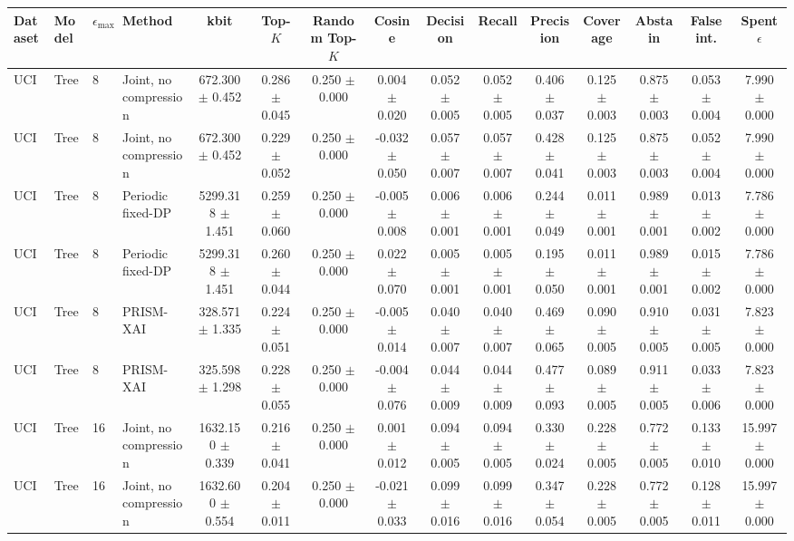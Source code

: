 \begin{tabular}{llllccccccccccc}
\toprule
Dataset & Model & $\epsilon_{\max}$ & Method & kbit & Top-$K$ & Random Top-$K$ & Cosine & Decision & Recall & Precision & Coverage & Abstain & False int. & Spent $\epsilon$ \\
\midrule
UCI & Tree & 8 & Joint, no compression & 672.300 $\pm$ 0.452 & 0.286 $\pm$ 0.045 & 0.250 $\pm$ 0.000 & 0.004 $\pm$ 0.020 & 0.052 $\pm$ 0.005 & 0.052 $\pm$ 0.005 & 0.406 $\pm$ 0.037 & 0.125 $\pm$ 0.003 & 0.875 $\pm$ 0.003 & 0.053 $\pm$ 0.004 & 7.990 $\pm$ 0.000 \\
UCI & Tree & 8 & Joint, no compression & 672.300 $\pm$ 0.452 & 0.229 $\pm$ 0.052 & 0.250 $\pm$ 0.000 & -0.032 $\pm$ 0.050 & 0.057 $\pm$ 0.007 & 0.057 $\pm$ 0.007 & 0.428 $\pm$ 0.041 & 0.125 $\pm$ 0.003 & 0.875 $\pm$ 0.003 & 0.052 $\pm$ 0.004 & 7.990 $\pm$ 0.000 \\
UCI & Tree & 8 & Periodic fixed-DP & 5299.318 $\pm$ 1.451 & 0.259 $\pm$ 0.060 & 0.250 $\pm$ 0.000 & -0.005 $\pm$ 0.008 & 0.006 $\pm$ 0.001 & 0.006 $\pm$ 0.001 & 0.244 $\pm$ 0.049 & 0.011 $\pm$ 0.001 & 0.989 $\pm$ 0.001 & 0.013 $\pm$ 0.002 & 7.786 $\pm$ 0.000 \\
UCI & Tree & 8 & Periodic fixed-DP & 5299.318 $\pm$ 1.451 & 0.260 $\pm$ 0.044 & 0.250 $\pm$ 0.000 & 0.022 $\pm$ 0.070 & 0.005 $\pm$ 0.001 & 0.005 $\pm$ 0.001 & 0.195 $\pm$ 0.050 & 0.011 $\pm$ 0.001 & 0.989 $\pm$ 0.001 & 0.015 $\pm$ 0.002 & 7.786 $\pm$ 0.000 \\
UCI & Tree & 8 & PRISM-XAI & 328.571 $\pm$ 1.335 & 0.224 $\pm$ 0.051 & 0.250 $\pm$ 0.000 & -0.005 $\pm$ 0.014 & 0.040 $\pm$ 0.007 & 0.040 $\pm$ 0.007 & 0.469 $\pm$ 0.065 & 0.090 $\pm$ 0.005 & 0.910 $\pm$ 0.005 & 0.031 $\pm$ 0.005 & 7.823 $\pm$ 0.000 \\
UCI & Tree & 8 & PRISM-XAI & 325.598 $\pm$ 1.298 & 0.228 $\pm$ 0.055 & 0.250 $\pm$ 0.000 & -0.004 $\pm$ 0.076 & 0.044 $\pm$ 0.009 & 0.044 $\pm$ 0.009 & 0.477 $\pm$ 0.093 & 0.089 $\pm$ 0.005 & 0.911 $\pm$ 0.005 & 0.033 $\pm$ 0.006 & 7.823 $\pm$ 0.000 \\
UCI & Tree & 16 & Joint, no compression & 1632.150 $\pm$ 0.339 & 0.216 $\pm$ 0.041 & 0.250 $\pm$ 0.000 & 0.001 $\pm$ 0.012 & 0.094 $\pm$ 0.005 & 0.094 $\pm$ 0.005 & 0.330 $\pm$ 0.024 & 0.228 $\pm$ 0.005 & 0.772 $\pm$ 0.005 & 0.133 $\pm$ 0.010 & 15.997 $\pm$ 0.000 \\
UCI & Tree & 16 & Joint, no compression & 1632.600 $\pm$ 0.554 & 0.204 $\pm$ 0.011 & 0.250 $\pm$ 0.000 & -0.021 $\pm$ 0.033 & 0.099 $\pm$ 0.016 & 0.099 $\pm$ 0.016 & 0.347 $\pm$ 0.054 & 0.228 $\pm$ 0.005 & 0.772 $\pm$ 0.005 & 0.128 $\pm$ 0.011 & 15.997 $\pm$ 0.000 \\

\end{tabular}

